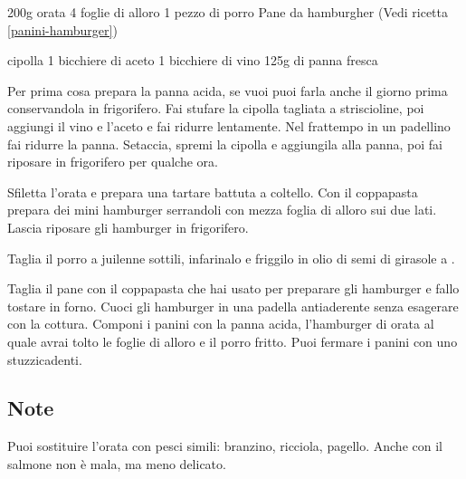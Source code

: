 \begin{ingreds}
	200g orata 
	4 foglie di alloro 
	1 pezzo di porro 
	Pane da hamburgher (Vedi ricetta \ref{panini-hamburger})
	
\columnbreak
{} cipolla
	1 bicchiere di aceto
	1 bicchiere di vino
	125g di panna fresca
\end{ingreds}

\begin{method}
Per prima cosa prepara la panna acida, se vuoi puoi farla anche il giorno prima conservandola in frigorifero. Fai stufare la cipolla tagliata a striscioline, poi aggiungi il vino e l'aceto e fai ridurre lentamente. Nel frattempo in un padellino fai ridurre la panna. Setaccia, spremi la cipolla e aggiungila alla panna, poi fai riposare in frigorifero per qualche ora.

Sfiletta l'orata e prepara una tartare battuta a coltello. Con il coppapasta prepara dei mini hamburger serrandoli con mezza foglia di alloro sui due lati. Lascia riposare gli hamburger in frigorifero.

Taglia il porro a juilenne sottili, infarinalo e friggilo in olio di semi di girasole a .

Taglia il pane con il coppapasta che hai usato per preparare gli hamburger e fallo tostare in forno. Cuoci gli hamburger in una padella antiaderente senza esagerare con la cottura. Componi i panini con la panna acida, l'hamburger di orata al quale avrai tolto le foglie di alloro e il porro fritto. Puoi fermare i panini con uno stuzzicadenti.
\end{method}
\subsection*{Note}
		Puoi sostituire l'orata con pesci simili: branzino, ricciola, pagello. Anche con il salmone non è mala, ma meno delicato.

